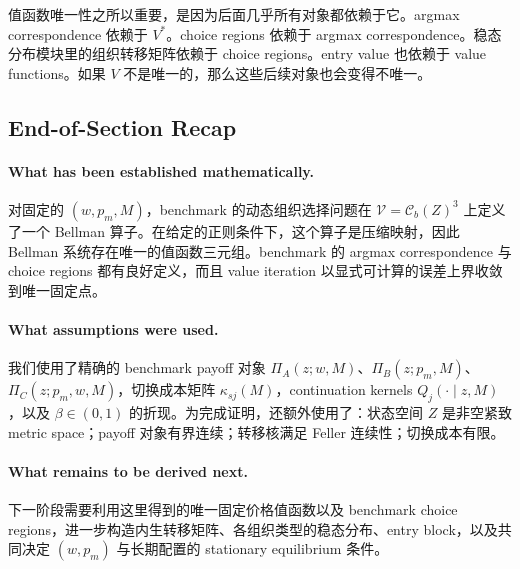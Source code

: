 值函数唯一性之所以重要，是因为后面几乎所有对象都依赖于它。argmax correspondence 依赖于 $V^*$。choice regions 依赖于 argmax correspondence。稳态分布模块里的组织转移矩阵依赖于 choice regions。entry value 也依赖于 value functions。如果 $V$ 不是唯一的，那么这些后续对象也会变得不唯一。

\subsection{End-of-Section Recap}

\paragraph{What has been established mathematically.}
对固定的 $(w,p_m,M)$，benchmark 的动态组织选择问题在 $\mathcal V=\mathcal C_b(Z)^3$ 上定义了一个 Bellman 算子。在给定的正则条件下，这个算子是压缩映射，因此 Bellman 系统存在唯一的值函数三元组。benchmark 的 argmax correspondence 与 choice regions 都有良好定义，而且 value iteration 以显式可计算的误差上界收敛到唯一固定点。

\paragraph{What assumptions were used.}
我们使用了精确的 benchmark payoff 对象 $\Pi_A(z;w,M)$、$\Pi_B(z;p_m,M)$、$\Pi_C(z;p_m,w,M)$，切换成本矩阵 $\kappa_{sj}(M)$，continuation kernels $Q_j(\cdot\mid z,M)$，以及 $\beta\in(0,1)$ 的折现。为完成证明，还额外使用了：状态空间 $Z$ 是非空紧致 metric space；payoff 对象有界连续；转移核满足 Feller 连续性；切换成本有限。

\paragraph{What remains to be derived next.}
下一阶段需要利用这里得到的唯一固定价格值函数以及 benchmark choice regions，进一步构造内生转移矩阵、各组织类型的稳态分布、entry block，以及共同决定 $(w,p_m)$ 与长期配置的 stationary equilibrium 条件。


